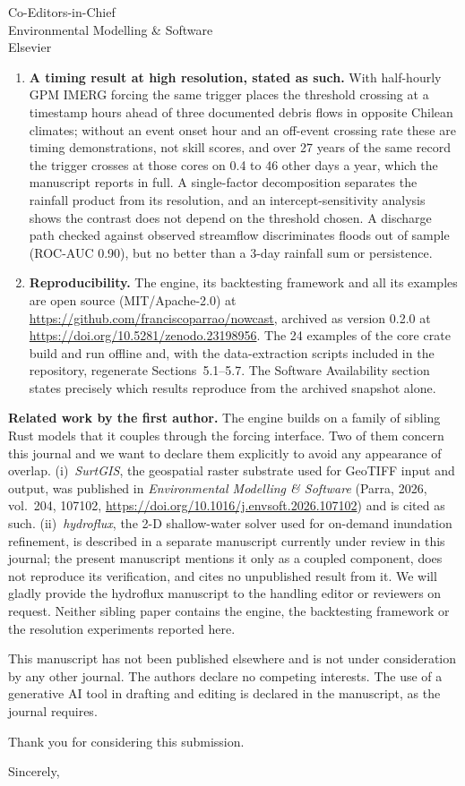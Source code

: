 \documentclass[11pt]{letter}
\begin{document}
\begin{letter}{Co-Editors-in-Chief\\
Environmental Modelling \& Software\\
Elsevier}
\begin{enumerate}
    \item \textbf{A timing result at high resolution, stated as such.} With
    half-hourly GPM IMERG forcing the same trigger places the threshold crossing
    at a timestamp hours ahead of three documented debris flows in opposite
    Chilean climates; without an event onset hour and an off-event crossing rate
    these are timing demonstrations, not skill scores, and over 27 years of the
    same record the trigger crosses at those cores on 0.4 to 46 other days a year,
    which the manuscript reports in full. A
    single-factor decomposition separates the rainfall product from its
    resolution, and an intercept-sensitivity analysis shows the contrast does not
    depend on the threshold chosen. A discharge path checked against observed
    streamflow discriminates floods out of sample (ROC-AUC 0.90), but no better
    than a 3-day rainfall sum or persistence.

    \item \textbf{Reproducibility.} The engine, its backtesting framework and
    all its examples are open source (MIT/Apache-2.0) at
    \url{https://github.com/franciscoparrao/nowcast}, archived as version 0.2.0
    at \url{https://doi.org/10.5281/zenodo.23198956}. The 24 examples of the
    core crate build and run offline and, with the data-extraction scripts
    included in the repository, regenerate Sections~5.1--5.7. The Software Availability section states precisely which
    results reproduce from the archived snapshot alone.
\end{enumerate}

\textbf{Related work by the first author.} The engine builds on a family of sibling
Rust models that it couples through the forcing interface. Two of them concern
this journal and we want to declare them explicitly to avoid any appearance of
overlap. (i)~\emph{SurtGIS}, the geospatial raster substrate used for GeoTIFF
input and output, was published in \textit{Environmental Modelling \& Software}
(Parra, 2026, vol.~204, 107102, \url{https://doi.org/10.1016/j.envsoft.2026.107102})
and is cited as such. (ii)~\emph{hydroflux}, the 2-D shallow-water solver used
for on-demand inundation refinement, is described in a separate manuscript
currently under review in this journal; the present manuscript mentions it only
as a coupled component, does not reproduce its verification, and cites no
unpublished result from it. We will gladly provide the hydroflux manuscript to the
handling editor or reviewers on request. Neither sibling paper contains the
engine, the backtesting framework or the resolution experiments reported here.

This manuscript has not been published elsewhere and is not under consideration
by any other journal. The authors declare no competing interests. The use of a generative
AI tool in drafting and editing is declared in the manuscript, as the journal
requires.

Thank you for considering this submission.

\closing{Sincerely,}

\end{letter}
\end{document}
